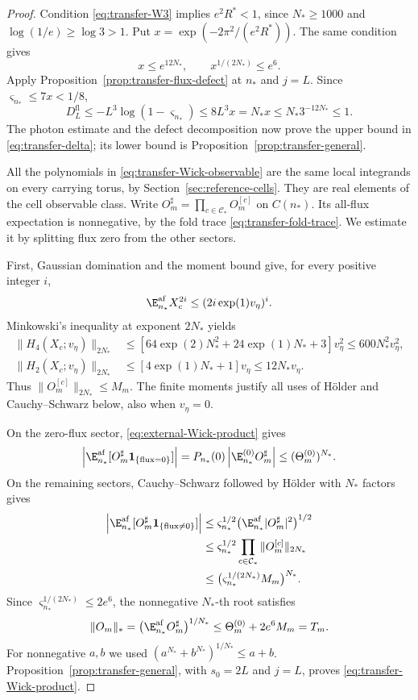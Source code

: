 \begin{proof}
Condition \eqref{eq:transfer-W3} implies $e^2R^*<1$,
since $N_*\ge1000$ and $\log(1/e)\ge\log3>1$.
Put $x=\exp(-2\pi^2/(e^2R^*))$. The same condition gives
\[
 x\le e^{12N_*},\qquad x^{1/(2N_*)}\le e^6.
\]
Apply Proposition~\ref{prop:transfer-flux-defect} at
$n_*$ and $j=L$. Since $\varsigma_{n_*}\le7x<1/8$,
\[
 D_L^{\mathrm{fl}}\le-L^3\log(1-\varsigma_{n_*})
              \le8L^3x=N_*x
              \le N_*3^{-12N_*}\le1.
\]
The photon estimate and the defect decomposition
now prove the upper bound in \eqref{eq:transfer-delta};
its lower bound is Proposition~\ref{prop:transfer-general}.

All the polynomials in \eqref{eq:transfer-Wick-observable}
are the same local integrands on every carrying torus,
by Section~\ref{sec:reference-cells}. They are real
elements of the cell observable class. Write
$O_m^\sharp=\prod_{c\in\mathcal C_*}O_m^{[c]}$ on
$C(n_*)$. Its all-flux expectation is nonnegative,
by the fold trace \eqref{eq:transfer-fold-trace}.
We estimate it by splitting flux zero from the
other sectors.

First, Gaussian domination and the moment bound
give, for every positive integer $i$,
\[
 \E_{n_*}^{\mathrm{af}}X_c^{2i}
                              \le(2i\exp(1)v_\eta)^i.
\]
Minkowski's inequality at exponent $2N_*$ yields
\begin{align*}
 \|H_4(X_c;v_\eta)\|_{2N_*}
   &\le[64\exp(2)N_*^2+24\exp(1)N_*+3]v_\eta^2
       \le600N_*^2v_\eta^2,\\
 \|H_2(X_c;v_\eta)\|_{2N_*}
   &\le[4\exp(1)N_*+1]v_\eta
       \le12N_*v_\eta.
\end{align*}
Thus $\|O_m^{[c]}\|_{2N_*}\le M_m$.
The finite moments justify all uses of H\"older
and Cauchy--Schwarz below, also when $v_\eta=0$.

On the zero-flux sector,
\eqref{eq:external-Wick-product} gives
\[
 \left|\E_{n_*}^{\mathrm{af}}
               [O_m^\sharp\mathbf1_{\{\mathrm{flux}=0\}}]\right|
   =P_{n_*}(0)\left|\E_{n_*}^{(0)}O_m^\sharp\right|
   \le(\Theta_m^{(0)})^{N_*}.
\]
On the remaining sectors, Cauchy--Schwarz followed
by H\"older with $N_*$ factors gives
\begin{align*}
 \left|\E_{n_*}^{\mathrm{af}}
               [O_m^\sharp\mathbf1_{\{\mathrm{flux}\ne0\}}]\right|
 &\le\varsigma_{n_*}^{1/2}
                \bigl(\E_{n_*}^{\mathrm{af}}|O_m^\sharp|^2\bigr)^{1/2}\\
 &\le\varsigma_{n_*}^{1/2}
                \prod_{c\in\mathcal C_*}\|O_m^{[c]}\|_{2N_*}\\
 &\le\bigl(\varsigma_{n_*}^{1/(2N_*)}M_m\bigr)^{N_*}.
\end{align*}
Since $\varsigma_{n_*}^{1/(2N_*)}\le2e^6$,
the nonnegative $N_*$-th root satisfies
\[
 \|O_m\|_*=
       \bigl(\E_{n_*}^{\mathrm{af}}O_m^\sharp\bigr)^{1/N_*}
             \le\Theta_m^{(0)}+2e^6M_m=T_m.
\]
For nonnegative $a,b$ we used
$(a^{N_*}+b^{N_*})^{1/N_*}\le a+b$.
Proposition~\ref{prop:transfer-general}, with
$s_0=2L$ and $j=L$, proves
\eqref{eq:transfer-Wick-product}.


\end{proof}
